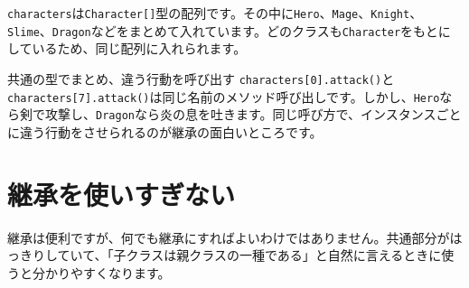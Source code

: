 \begin{listing}[htbp]
\inputminted[firstline=48,lastline=78]{ts}{typescript-p5/listings/chapter14/rpg-characters.ts}
\caption{味方キャラクターと基本のモンスター（\texttt{chapter14/rpg-characters.ts}）}
\label{lst:chapter14-rpg-hero-monster}
\end{listing}

\begin{listing}[htbp]
\inputminted[firstline=80,lastline=114]{ts}{typescript-p5/listings/chapter14/rpg-characters.ts}
\caption{地上と空中で分かれるモンスター（\texttt{chapter14/rpg-characters.ts}）}
\label{lst:chapter14-rpg-ground-flying-monsters}
\end{listing}

\begin{listing}[htbp]
\inputminted[firstline=116,lastline=130]{ts}{typescript-p5/listings/chapter14/rpg-characters.ts}
\caption{ボスモンスターとドラゴン（\texttt{chapter14/rpg-characters.ts}）}
\label{lst:chapter14-rpg-boss-monster}
\end{listing}

\begin{listing}[htbp]
\inputminted[firstline=132,lastline=179]{ts}{typescript-p5/listings/chapter14/rpg-characters.ts}
\caption{RPG風キャラクターを画面に表示する（\texttt{chapter14/rpg-characters.ts}）}
\label{lst:chapter14-rpg-sketch}
\end{listing}

\texttt{characters}は\texttt{Character[]}型の配列です。その中に\texttt{Hero}、\texttt{Mage}、\texttt{Knight}、\texttt{Slime}、\texttt{Dragon}などをまとめて入れています。どのクラスも\texttt{Character}をもとにしているため、同じ配列に入れられます。

\begin{pointbox}{共通の型でまとめ、違う行動を呼び出す}
\texttt{characters[0].attack()}と\texttt{characters[7].attack()}は同じ名前のメソッド呼び出しです。しかし、\texttt{Hero}なら剣で攻撃し、\texttt{Dragon}なら炎の息を吐きます。同じ呼び方で、インスタンスごとに違う行動をさせられるのが継承の面白いところです。
\end{pointbox}

\section{継承を使いすぎない}

継承は便利ですが、何でも継承にすればよいわけではありません。共通部分がはっきりしていて、「子クラスは親クラスの一種である」と自然に言えるときに使うと分かりやすくなります。

